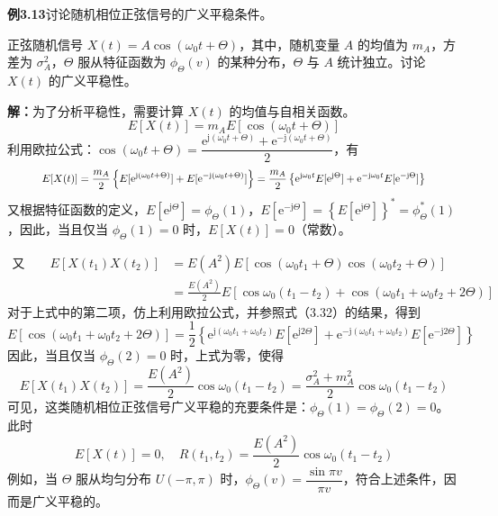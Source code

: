 \documentclass[11pt,openany,UTF8]{ctexbook}
\newcommand{\eu}{\mathrm{e}}                       %
\newcommand{\ju}{\mathrm{j}}                       %
\newcommand{\E}{E}                                 %
\newcommand{\fw}[1]{{\xeCJKsetup{CJKecglue={}}（#1\nobreak）}}
\begin{document}
\begin{examplebox}
\textbf{例3.13}\quad 讨论随机相位正弦信号的广义平稳条件\nobreak。

正弦随机信号 $X(t)=A\cos(\omega_0t+\Theta)$\nobreak，其中\nobreak，随机变量 $A$ 的均值为 $m_A$\nobreak，方差为 $\sigma_A^2$\nobreak，$\Theta$ 服从特征函数为 $\phi_{\Theta}(v)$ 的某种分布\nobreak，$\Theta$ 与 $A$ 统计独立\nobreak。讨论 $X(t)$ 的广义平稳性\nobreak。

\textbf{解\nobreak：}\quad 为了分析平稳性\nobreak，需要计算 $X(t)$ 的均值与自相关函数\nobreak。
\[
\E[X(t)]=m_A\E[\cos(\omega_0t+\Theta)]
\]
利用欧拉公式\nobreak：$\cos(\omega_0t+\Theta)=\dfrac{\eu^{\ju(\omega_0t+\Theta)}+\eu^{-\ju(\omega_0t+\Theta)}}{2}$\nobreak，有
\begin{equation}
\resizebox{\dimexpr\linewidth-4em\relax}{!}{$\displaystyle
\E[X(t)]=\frac{m_A}{2}\left\{\E[\eu^{\ju(\omega_0t+\Theta)}]+\E[\eu^{-\ju(\omega_0t+\Theta)}]\right\}=\frac{m_A}{2}\left\{\eu^{\ju\omega_0t}\E[\eu^{\ju\Theta}]+\eu^{-\ju\omega_0t}\E[\eu^{-\ju\Theta}]\right\}$}
\label{eq:3.32}
\end{equation}
又根据特征函数的定义\nobreak，$\E[\eu^{\ju\Theta}]=\phi_{\Theta}(1)$\nobreak，$\E[\eu^{-\ju\Theta}]=\left\{\E[\eu^{\ju\Theta}]\right\}^{*}=\phi_{\Theta}^{*}(1)$\nobreak，因此\nobreak，当且仅当 $\phi_{\Theta}(1)=0$ 时\nobreak，$\E[X(t)]=0$（常数\nobreak）\nobreak。

\[
\begin{aligned}
\text{又}\qquad \E[X(t_1)X(t_2)]&=\E(A^2)\E[\cos(\omega_0t_1+\Theta)\cos(\omega_0t_2+\Theta)]\\
&=\frac{\E(A^2)}{2}\E[\cos\omega_0(t_1-t_2)+\cos(\omega_0t_1+\omega_0t_2+2\Theta)]
\end{aligned}
\]
对于上式中的第二项\nobreak，仿上利用欧拉公式\nobreak，并参照式\fw{3.32}的结果\nobreak，得到
\[
\E[\cos(\omega_0t_1+\omega_0t_2+2\Theta)]=\frac{1}{2}\left\{\eu^{\ju(\omega_0t_1+\omega_0t_2)}\E[\eu^{\ju2\Theta}]+\eu^{-\ju(\omega_0t_1+\omega_0t_2)}\E[\eu^{-\ju2\Theta}]\right\}
\]
因此\nobreak，当且仅当 $\phi_{\Theta}(2)=0$ 时\nobreak，上式为零\nobreak，使得
\[
\E[X(t_1)X(t_2)]=\frac{\E(A^2)}{2}\cos\omega_0(t_1-t_2)=\frac{\sigma_A^2+m_A^2}{2}\cos\omega_0(t_1-t_2)
\]
可见\nobreak，这类随机相位正弦信号广义平稳的充要条件是\nobreak：$\phi_{\Theta}(1)=\phi_{\Theta}(2)=0$\nobreak。此时
\[
\E[X(t)]=0,\quad R(t_1,t_2)=\frac{\E(A^2)}{2}\cos\omega_0(t_1-t_2)
\]
例如\nobreak，当 $\Theta$ 服从均匀分布 $U(-\pi,\pi)$ 时\nobreak，$\phi_{\Theta}(v)=\dfrac{\sin\pi v}{\pi v}$\nobreak，符合上述条件\nobreak，因而是广义平稳的\nobreak。


\end{examplebox}
\end{document}
